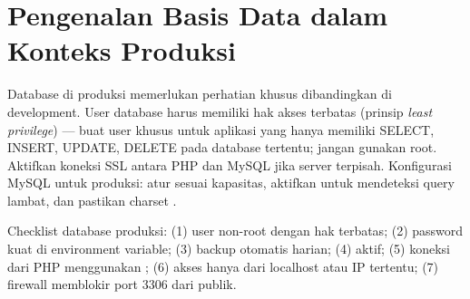 \section{Pengenalan Basis Data dalam Konteks Produksi}

Database di produksi memerlukan perhatian khusus dibandingkan di development. User database harus memiliki hak akses terbatas (prinsip \textit{least privilege}) --- buat user khusus untuk aplikasi yang hanya memiliki SELECT, INSERT, UPDATE, DELETE pada database tertentu; jangan gunakan root. Aktifkan koneksi SSL antara PHP dan MySQL jika server terpisah. Konfigurasi MySQL untuk produksi: atur  sesuai kapasitas, aktifkan  untuk mendeteksi query lambat, dan pastikan charset  \cite{mysqlDocs}.

\begin{catatan}
Checklist database produksi: (1) user non-root dengan hak terbatas; (2) password kuat di environment variable; (3) backup otomatis harian; (4)  aktif; (5) koneksi dari PHP menggunakan ; (6) akses hanya dari localhost atau IP tertentu; (7) firewall memblokir port 3306 dari publik.
\end{catatan}

